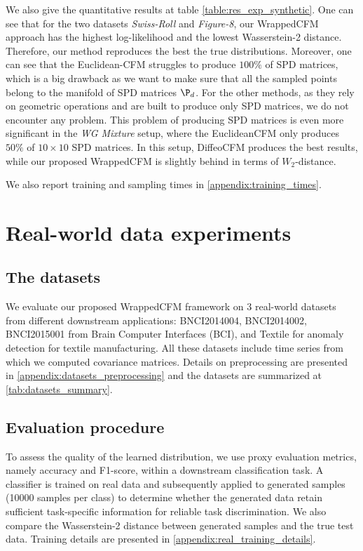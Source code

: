\documentclass[10pt]{article} %
\theoremstyle{plain}
\theoremstyle{definition}
\theoremstyle{remark}
\begin{document}
We also give the quantitative results at table \cref{table:res_exp_synthetic}. One can see that for the two datasets \emph{Swiss-Roll} and  \emph{Figure-8}, our WrappedCFM approach has the highest log-likelihood and the lowest Wasserstein-2 distance. Therefore, our method reproduces the best the true distributions. Moreover, one can see that the Euclidean-CFM struggles to produce $100 \%$ of SPD matrices, which is a big drawback as we want to make sure that all the sampled points belong to the manifold of SPD matrices $\P_d$. For the other methods, as they rely on geometric operations and are built to produce only SPD matrices, we do not encounter any problem. This problem of producing SPD matrices is even more significant in the \emph{WG Mixture} setup, where the EuclideanCFM only produces $50\%$ of $10 \times 10$ SPD matrices. In this setup, DiffeoCFM produces the best results, while our proposed WrappedCFM is slightly behind in terms of $W_2$-distance.

We also report training and sampling times in \cref{appendix:training_times}.

\section{Real-world data experiments}
\label{sec:real_world_experiments}
\subsection{The datasets}
We evaluate our proposed WrappedCFM framework on 3 real-world datasets from different downstream applications: BNCI2014004, BNCI2014002, BNCI2015001 \citep{Leebbcidataset} from Brain Computer Interfaces (BCI), and Textile \citep{MVTec2021} for anomaly detection for textile manufacturing. All these datasets include time series from which we computed covariance matrices. Details on preprocessing are presented in \cref{appendix:datasets_preprocessing} and the datasets are summarized at \cref{tab:datasets_summary}.

\subsection{Evaluation procedure}
To assess the quality of the learned distribution, we use proxy evaluation metrics, namely accuracy and F1-score, within a downstream classification task. A classifier is trained on real data and subsequently applied to generated samples (10000 samples per class) to determine whether the generated data retain sufficient task-specific information for reliable task discrimination. We also compare the Wasserstein-2 distance between generated samples and the true test data. Training details are presented in \cref{appendix:real_training_details}.
\end{document}
